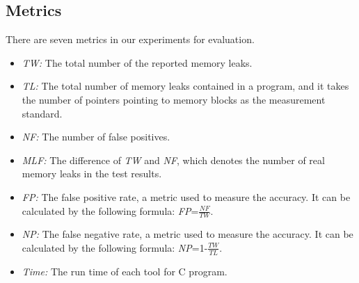 \subsection{Metrics}\label{ssec:m}
There are seven metrics in our experiments for evaluation.
\begin{itemize}
\item \textit{TW:} The total number of the reported memory leaks.
\item \textit{TL:} The total number of memory leaks contained in a program, and it takes the number of pointers pointing to memory blocks as the measurement standard.
\item \textit{NF:} The number of false positives.
\item \textit{MLF:} The difference of \textit{TW} and \textit{NF}, which denotes the number of real memory leaks in the test results.
\item \textit{FP:} The false positive rate, a metric used to measure the accuracy. It can be calculated by the following formula: \textit{FP}=$\frac{\textit{NF}}{\textit{TW}}$.
\item \textit{NP:} The false negative rate, a metric used to measure the accuracy. It can be calculated by the following formula: \textit{NP}=1-$\frac{\textit{TW}}{\textit{TL}}$.
\item \textit{Time:} The run time of each tool for C program.
\end{itemize}